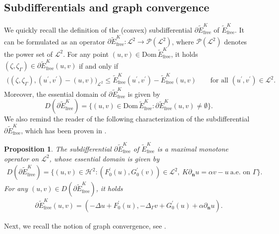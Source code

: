 \documentclass[11pt,reqno]{amsart}
\newtheorem{proposition}[theorem]{Proposition}
\theoremstyle{remark}
\numberwithin{equation}{section}
\newcommand{\bigscp}[2]{\big( #1 , #2 \big)}
\newcommand{\n}{\mathbf{n}}
\newcommand{\del}{\partial}
\newcommand{\deln}{\partial_\n}
\newcommand{\Lap}{\Delta}
\newcommand{\Lapg}{\Delta_\Ga}
\newcommand{\Ga}{\Gamma}
\newcommand{\free}{\mathrm{free}}
\begin{document}
\subsection{Subdifferentials and graph convergence}

We quickly recall the definition of the (convex) subdifferential $\del \widetilde{E}_\free^K$ of $\widetilde{E}_\free^K$. It can be formulated as an operator
$\del \widetilde{E}_\free^K:\mathcal{L}^2\rightarrow \mathcal{P}(\mathcal{L}^2)$, where
$\mathcal{P}(\mathcal{L}^2)$ denotes the power set of $\mathcal{L}^2$.
For any point $(u,v)\in\mathrm{Dom}\,\widetilde{E}_\free^K$, 
it holds $(\zeta,\zeta_\Ga)\in\del\widetilde E_\free^K(u,v)$ if and only if
\begin{align*}
 \bigscp{(\zeta,\zeta_\Ga)}{(u^\prime,v^\prime) - (u,v)}_{\mathcal{L}^2} \leq \widetilde E_\free^K(u^\prime,v^\prime) - \widetilde E_\free^K(u,v) \qquad\text{for all~}(u^\prime,v^\prime)\in\mathcal{L}^2.
\end{align*}
Moreover, the essential domain of $\del \widetilde{E}_\free^K$ is given by
\begin{equation*}
    D(\del \widetilde{E}_\free^K) 
    = \big\{ (u,v) \in \mathrm{Dom}\,\widetilde{E}_\free^K : 
    \del \widetilde{E}_\free^K(u,v) \neq \emptyset \big\}.
\end{equation*}
We also remind the reader of the following characterization of the subdifferential $\partial\widetilde E_\free^K$, which has been proven in \cite[Proposition~4.2]{Giorgini2026}.

\begin{proposition}\label{App:Proposition:Subdiff}
    The subdifferential $\partial \widetilde{E}_\free^K$ of $\widetilde{E}_\free^K$ is a maximal monotone operator on $\mathcal{L}^2$, whose essential domain is given by
    \begin{align*}
        D(\partial \widetilde{E}_\free^K) = \{(u, v)\in\mathcal{H}^2: (F_0^\prime(u), G_0^\prime(v))\in\mathcal{L}^2, \ K\deln u = \alpha v - u \ \text{a.e.~on }\Ga\}.
    \end{align*}
    For any $(u,v)\in D(\partial \widetilde{E}_\free^K)$, it holds
    \begin{align}
    \label{EQ:DELE}
        \partial \widetilde{E}_\free^K(u, v) = (-\Lap u + F_0^\prime(u), -\Lapg v + G_0^\prime(u) + \alpha\deln u).
    \end{align}
\end{proposition}

Next, we recall the notion of graph convergence, see \cite[Section~3.7, Definition~3.58]{Attouch1984}.
\end{document}
